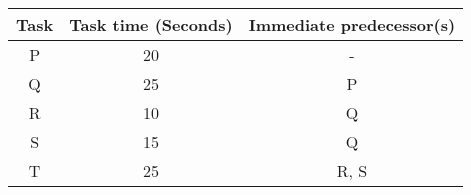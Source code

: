 \begin{center}
\begin{tabular}{|c|c|c|}
    \hline
    Task & Task time (Seconds) & Immediate predecessor(s) \\
    \hline
    P & 20 & - \\ \hline
    Q & 25 & P \\  \hline
    R & 10 & Q \\ \hline
    S & 15 & Q \\ \hline 
    T & 25 & R, S \\    \hline
\end{tabular}
\end{center}